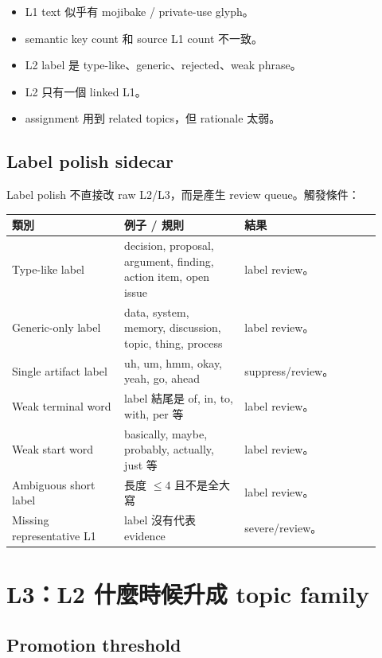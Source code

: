 \documentclass[11pt]{article}
\begin{document}
\begin{itemize}
  \item L1 text 似乎有 mojibake / private-use glyph。
  \item semantic key count 和 source L1 count 不一致。
  \item L2 label 是 type-like、generic、rejected、weak phrase。
  \item L2 只有一個 linked L1。
  \item assignment 用到 related topics，但 rationale 太弱。
\end{itemize}

\subsection{Label polish sidecar}

Label polish 不直接改 raw L2/L3，而是產生 review queue。觸發條件：

\begin{longtable}{p{0.28\linewidth}p{0.30\linewidth}p{0.34\linewidth}}
\toprule
\textbf{類別} & \textbf{例子 / 規則} & \textbf{結果}\\
\midrule
Type-like label & decision, proposal, argument, finding, action item, open issue & label review。\\
Generic-only label & data, system, memory, discussion, topic, thing, process & label review。\\
Single artifact label & uh, um, hmm, okay, yeah, go, ahead & suppress/review。\\
Weak terminal word & label 結尾是 of, in, to, with, per 等 & label review。\\
Weak start word & basically, maybe, probably, actually, just 等 & label review。\\
Ambiguous short label & 長度 \(\leq 4\) 且不是全大寫 & label review。\\
Missing representative L1 & label 沒有代表 evidence & severe/review。\\
\bottomrule
\end{longtable}

\section{L3：L2 什麼時候升成 topic family}

\subsection{Promotion threshold}
\end{document}
